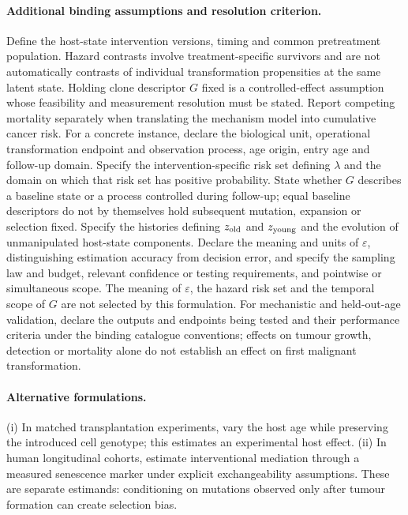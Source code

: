 \documentclass[11pt]{article}
\begin{document}
\paragraph{Additional binding assumptions and resolution criterion.} Define the host-state intervention versions, timing and common pretreatment population. Hazard contrasts involve treatment-specific survivors and are not automatically contrasts of individual transformation propensities at the same latent state. Holding clone descriptor $G$ fixed is a controlled-effect assumption whose feasibility and measurement resolution must be stated. Report competing mortality separately when translating the mechanism model into cumulative cancer risk. For a concrete instance, declare the biological unit, operational transformation endpoint and observation process, age origin, entry age and follow-up domain. Specify the intervention-specific risk set defining $\lambda$ and the domain on which that risk set has positive probability. State whether $G$ describes a baseline state or a process controlled during follow-up; equal baseline descriptors do not by themselves hold subsequent mutation, expansion or selection fixed. Specify the histories defining $z_{\rm old}$ and $z_{\rm young}$ and the evolution of unmanipulated host-state components. Declare the meaning and units of $\varepsilon$, distinguishing estimation accuracy from decision error, and specify the sampling law and budget, relevant confidence or testing requirements, and pointwise or simultaneous scope. The meaning of $\varepsilon$, the hazard risk set and the temporal scope of $G$ are not selected by this formulation. For mechanistic and held-out-age validation, declare the outputs and endpoints being tested and their performance criteria under the binding catalogue conventions; effects on tumour growth, detection or mortality alone do not establish an effect on first malignant transformation.

\paragraph{Alternative formulations.} (i) In matched transplantation experiments, vary the host age while preserving the introduced cell genotype; this estimates an experimental host effect. (ii) In human longitudinal cohorts, estimate interventional mediation through a measured senescence marker under explicit exchangeability assumptions. These are separate estimands: conditioning on mutations observed only after tumour formation can create selection bias.
\end{document}
